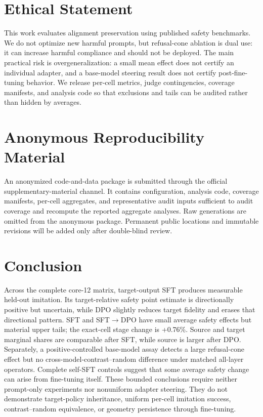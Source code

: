\documentclass[letterpaper]{article}
\newcommand{\PairedStageDeltaPP}{+0.76}
\begin{document}
\section*{Ethical Statement}

This work evaluates alignment preservation using published safety benchmarks. We do
not optimize new harmful prompts, but refusal-cone ablation is dual use: it can increase
harmful compliance and should not be deployed. The main practical risk is
overgeneralization: a small mean effect does not certify an individual adapter, and a
base-model steering result does not certify post-fine-tuning behavior. We release
per-cell metrics, judge contingencies, coverage manifests, and analysis code so that
exclusions and tails can be audited rather than hidden by averages.

\section*{Anonymous Reproducibility Material}

An anonymized code-and-data package is submitted through the official supplementary-material
channel. It contains configuration, analysis code, coverage manifests, per-cell aggregates,
and representative audit inputs sufficient to audit coverage and recompute the reported
aggregate analyses. Raw generations are omitted from the anonymous package. Permanent
public locations and immutable revisions will be added only after double-blind review.

\section{Conclusion}

Across the complete core-12 matrix, target-output SFT produces measurable held-out
imitation. Its target-relative safety point estimate is directionally positive but uncertain,
while DPO slightly reduces target fidelity and erases that directional pattern. SFT and
SFT$\rightarrow$DPO have small average
safety effects but material upper tails; the exact-cell stage change is
\PairedStageDeltaPP\%. Source and target marginal shares are comparable after SFT,
while source is larger after DPO. Separately, a positive-controlled base-model assay
detects a large refusal-cone effect but no cross-model-contrast--random difference under matched
all-layer operators. Complete self-SFT controls suggest that some average safety change
can arise from fine-tuning itself. These bounded conclusions require neither prompt-only
experiments nor nonuniform adapter steering. They do not demonstrate target-policy inheritance,
uniform per-cell imitation success, contrast--random equivalence, or geometry persistence
through fine-tuning.



\end{document}
